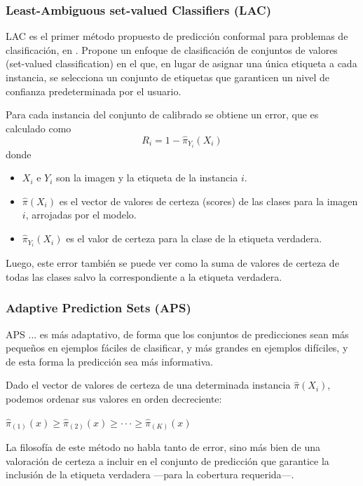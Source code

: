 \subsubsection{Least-Ambiguous set-valued Classifiers (LAC)}

LAC es el primer método propuesto de predicción conformal para problemas de clasificación, en 
\cite{sadinle2019}. Propone un enfoque de clasificación de conjuntos de valores (set-valued classification) 
en el que, en lugar de asignar una única etiqueta a cada instancia, se selecciona un conjunto de etiquetas 
que garanticen un nivel de confianza predeterminada por el usuario.

Para cada instancia del conjunto de calibrado se obtiene un error, que es calculado como
$$
R_i = 1 - \hat{\pi}_{Y_i}(X_i)
$$
donde
\begin{itemize}
    \item $X_i$ e $Y_i$ son la imagen y la etiqueta de la instancia $i$.
    \item $\hat{\pi}(X_i)$ es el vector de valores de certeza (scores) de las clases para la imagen $i$, 
    arrojadas por el modelo.
    \item $\hat{\pi}_{Y_i}(X_i)$ es el valor de certeza para la clase de la etiqueta verdadera.
\end{itemize}

Luego, este error también se puede ver como la suma de valores de certeza de todas las clases salvo la 
correspondiente a la etiqueta verdadera.




\subsubsection{Adaptive Prediction Sets (APS)}

APS \cite{romano2020} ... es más adaptativo, de forma que los conjuntos 
de predicciones sean más pequeños en ejemplos fáciles de clasificar, y más grandes en ejemplos difíciles, 
y de esta forma la predicción sea más informativa.

Dado el vector de valores de certeza de una determinada instancia $\hat{\pi}(X_i)$, podemos ordenar sus 
valores en orden decreciente:

$\hat{\pi}_{(1)}(x) \ge \hat{\pi}_{(2)}(x) \ge \cdot\cdot\cdot \ge \hat{\pi}_{(K)}(x)$

La filosofía de este método no habla tanto de error, sino más bien de una valoración de certeza a incluir en 
el conjunto de predicción que garantice la inclusión de la etiqueta verdadera ---para la cobertura 
requerida---.

